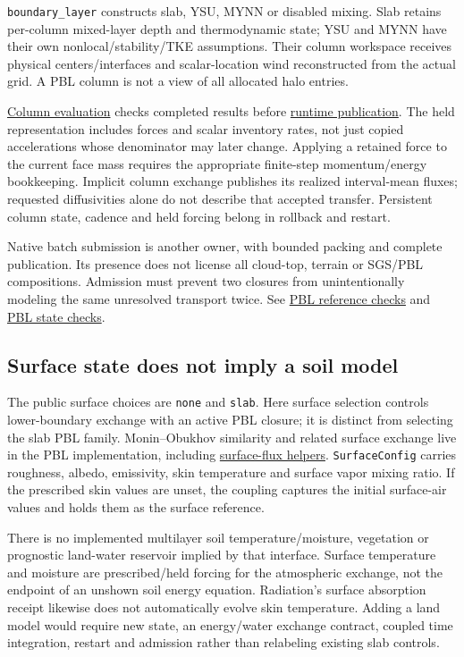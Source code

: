 \texttt{boundary\_layer} constructs slab, YSU, MYNN or disabled mixing. Slab
retains per-column mixed-layer depth and thermodynamic state; YSU and MYNN have
their own nonlocal/stability/TKE assumptions. Their column workspace receives
physical centers/interfaces and scalar-location wind reconstructed from the
actual grid. A PBL column is not a view of all allocated halo entries.

\href{../src/boundary_layer/column_evaluation.cpp}{Column evaluation}
checks completed results before
\href{../src/boundary_layer/runtime.cpp}{runtime publication}. The held
representation includes forces and scalar inventory rates, not just copied
accelerations whose denominator may later change. Applying a retained force
to the current face mass requires the appropriate finite-step momentum/energy
bookkeeping. Implicit column exchange publishes its realized interval-mean
fluxes; requested diffusivities alone do not describe that accepted transfer.
Persistent column state, cadence and held forcing belong in rollback and
restart.

Native batch submission is another owner, with bounded packing and complete
publication. Its presence does not license all cloud-top, terrain or SGS/PBL
compositions. Admission must prevent two closures from unintentionally modeling
the same unresolved transport twice. See
\href{../tests/physics/test_boundary_layer.cpp}{PBL reference checks} and
\href{../tests/physics/test_boundary_layer_runtime_state.cpp}{PBL state checks}.

\subsection{Surface state does not imply a soil model}

The public surface choices are \texttt{none} and \texttt{slab}. Here
surface selection controls lower-boundary exchange with an active PBL closure;
it is distinct from selecting the slab PBL family. Monin--Obukhov similarity
and related surface exchange live in the PBL implementation, including
\href{../src/boundary_layer/base/surface_fluxes.cpp}{surface-flux helpers}.
\texttt{SurfaceConfig} carries roughness, albedo, emissivity, skin temperature
and surface vapor mixing ratio. If the prescribed skin values are unset,
the coupling captures the initial surface-air values and holds them as the
surface reference.

There is no implemented multilayer soil temperature/moisture, vegetation or
prognostic land-water reservoir implied by that interface. Surface temperature
and moisture are prescribed/held forcing for the atmospheric exchange, not
the endpoint of an unshown soil energy equation. Radiation's surface absorption
receipt likewise does not automatically evolve skin temperature. Adding a
land model would require new state, an energy/water exchange contract, coupled
time integration, restart and admission rather than relabeling existing slab
controls.

